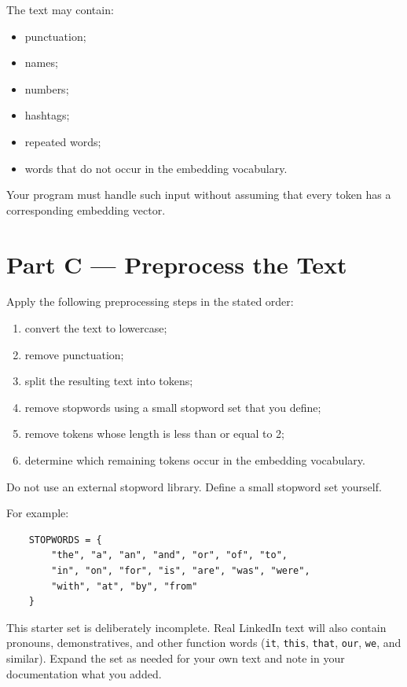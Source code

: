 \documentclass[12pt]{article}
\begin{document}
The text may contain:

\begin{itemize}
    \item punctuation;
    \item names;
    \item numbers;
    \item hashtags;
    \item repeated words;
    \item words that do not occur in the embedding vocabulary.
\end{itemize}

Your program must handle such input without assuming that every token
has a corresponding embedding vector.

\section*{Part C --- Preprocess the Text}

Apply the following preprocessing steps in the stated order:

\begin{enumerate}
    \item convert the text to lowercase;
    \item remove punctuation;
    \item split the resulting text into tokens;
    \item remove stopwords using a small stopword set that you define;
    \item remove tokens whose length is less than or equal to 2;
    \item determine which remaining tokens occur in the embedding
          vocabulary.
\end{enumerate}

Do not use an external stopword library. Define a small stopword set
yourself.

For example:

\begin{lstlisting}
    STOPWORDS = {
        "the", "a", "an", "and", "or", "of", "to",
        "in", "on", "for", "is", "are", "was", "were",
        "with", "at", "by", "from"
    }
\end{lstlisting}

This starter set is deliberately incomplete. Real LinkedIn text will
also contain pronouns, demonstratives, and other function words
(\texttt{it}, \texttt{this}, \texttt{that}, \texttt{our}, \texttt{we},
and similar). Expand the set as needed for your own text and note in
your documentation what you added.
\end{document}
